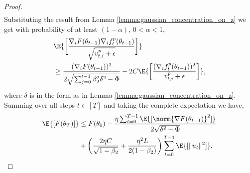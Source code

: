 \documentclass[letterpaper]{article} %
\begin{document}
\begin{proof}
\begin{align*}
    \end{align*}
    Substituting the result from Lemma \ref{lemma:gaussian_concentration_on_z} we get with probability of at least $(1-\alpha)$, $0< \alpha < 1 $,
    \begin{align*}
        &\E{\bigg[\frac{\nabla_i F(\theta_{t-1}) \nabla_i f_t^{p}(\theta_{t-1})}{\sqrt{v_{t, i}^{p} + \epsilon }}\bigg]} \\
        &\geq \frac{(\nabla_i F(\theta_{t-1}))^2}{2\sqrt{\sum_{j=0}^{t-1} \beta_2^{j}\delta^2 - \Phi}} - 2C\E{\bigg[ \frac{(\nabla_i f_t^{p}(\theta_{t-1}))^2}{v_{t,i}^{p}+ \epsilon} \bigg]},
    \end{align*}
    where $\delta$ is in the form as in Lemma \ref{lemma:gaussian_concentration_on_z}.
    Summing over all steps $t \in [T]$ and taking the complete expectation we have,
    \begin{align*}
        \E{[F(\theta_T)]} &\leq F(\theta_0) - \frac{\eta \sum_{t=0}^{T-1} \E{[\norm{\nabla F(\theta_{t-1})}^2]}}{2\sqrt{\delta^2 - \Phi}} \\ &+ \bigg(\frac{2\eta C}{\sqrt{1-\beta_2}} + \frac{\eta^2 L}{2(1-\beta_2)}\bigg) \sum_{t=0}^{T-1} \E{[\lVert u_{t} \rVert^2]},

\end{align*}
\end{proof}
\end{document}
